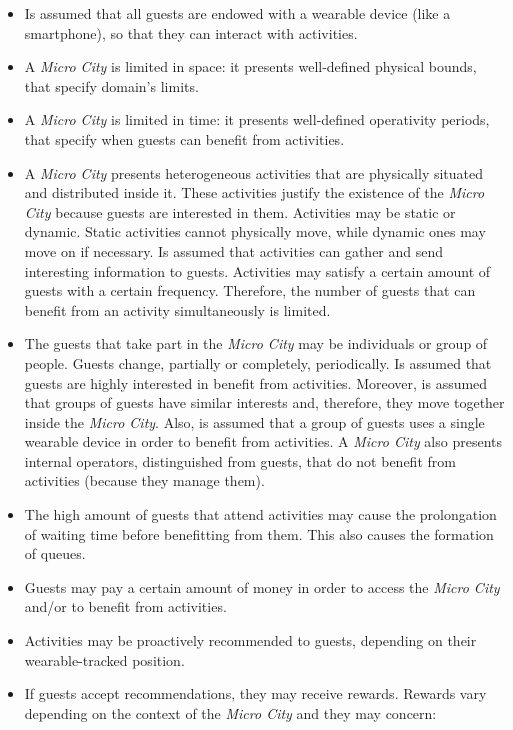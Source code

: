 \begin{itemize}
    \item Is assumed that all guests are endowed with a wearable device (like a smartphone), so that they can interact with activities.
    \item A \textit{Micro City} is limited in space: it presents well-defined physical bounds, that specify domain's limits.
    \item A \textit{Micro City} is limited in time: it presents well-defined operativity periods, that specify when guests can benefit from activities.
    \item A \textit{Micro City} presents heterogeneous activities that are physically situated and distributed inside it. These activities justify the existence of the \textit{Micro City} because guests are interested in them. Activities may be static or dynamic. Static activities cannot physically move, while dynamic ones may move on if necessary. Is assumed that activities can gather and send interesting information to guests. Activities may satisfy a certain amount of guests with a certain frequency. Therefore, the number of guests that can benefit from an activity simultaneously is limited.
    \item The guests that take part in the \textit{Micro City} may be individuals or group of people. Guests change, partially or completely, periodically. Is assumed that guests are highly interested in benefit from activities. Moreover, is assumed that groups of guests have similar interests and, therefore, they move together inside the \textit{Micro City}. Also, is assumed that a group of guests uses a single wearable device in order to benefit from activities. A \textit{Micro City} also presents internal operators, distinguished from guests, that do not benefit from activities (because they manage them).
    \item The high amount of guests that attend activities may cause the prolongation of waiting time before benefitting from them. This also causes the formation of queues.
    \item Guests may pay a certain amount of money in order to access the \textit{Micro City} and/or to benefit from activities.
    \item Activities may be proactively recommended to guests, depending on their wearable-tracked position.
    \item If guests accept recommendations, they may receive rewards. Rewards vary depending on the context of the \textit{Micro City} and they may concern:

\end{itemize}
